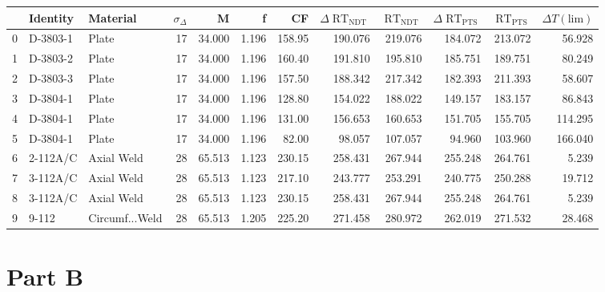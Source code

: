 \documentclass{article}
\begin{document}
\begin{table}
    \begin{tabular}{lllrrrrrrrrr}
        \toprule
        {} &                                  Identity &              Material &  $\sigma_\Delta$ &      M &    f &     CF &  $\Delta\operatorname{RT}_{\operatorname{NDT}}$ &  $\operatorname{RT}_{\operatorname{NDT}}$  & $\Delta\operatorname{RT}_{\operatorname{PTS}}$  &  $\operatorname{RT}_{\operatorname{PTS}}$ & $\Delta T(\text{lim})$ \\
       \midrule 
        0 &   D-3803-1 &           Plate &   17 & 34.000 & 1.196 & 158.95 &  190.076 & 219.076 &  184.072 & 213.072 &   56.928 \\
        1 &   D-3803-2 &           Plate &   17 & 34.000 & 1.196 & 160.40 &  191.810 & 195.810 &  185.751 & 189.751 &   80.249 \\
        2 &   D-3803-3 &           Plate &   17 & 34.000 & 1.196 & 157.50 &  188.342 & 217.342 &  182.393 & 211.393 &   58.607 \\
        3 &   D-3804-1 &           Plate &   17 & 34.000 & 1.196 & 128.80 &  154.022 & 188.022 &  149.157 & 183.157 &   86.843 \\
        4 &   D-3804-1 &           Plate &   17 & 34.000 & 1.196 & 131.00 &  156.653 & 160.653 &  151.705 & 155.705 &  114.295 \\
        5 &   D-3804-1 &           Plate &   17 & 34.000 & 1.196 &  82.00 &   98.057 & 107.057 &   94.960 & 103.960 &  166.040 \\
        6 &  2-112A/C &      Axial Weld &   28 & 65.513 & 1.123 & 230.15 &  258.431 & 267.944 &  255.248 & 264.761 &    5.239 \\
        7 &   3-112A/C &      Axial Weld &   28 & 65.513 & 1.123 & 217.10 &  243.777 & 253.291 &  240.775 & 250.288 &   19.712 \\
        8 &   3-112A/C &      Axial Weld &   28 & 65.513 & 1.123 & 230.15 &  258.431 & 267.944 &  255.248 & 264.761 &    5.239 \\
        9 &      9-112 &  Circumf...Weld &   28 & 65.513 & 1.205 & 225.20 &  271.458 & 280.972 &  262.019 & 271.532 &   28.468 \\
        \bottomrule
        \end{tabular}
    \end{table}
    
\section{Part B}
    
\end{document}
